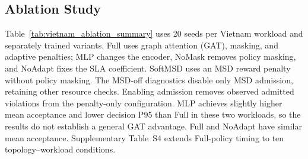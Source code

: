 \documentclass[final,5p]{elsarticle}
\newcommand{\rev}[1]{\textcolor{revisiongreen}{#1}}
\let\newrev\rev
\begin{document}
\begin{table}[t]
\color{revisiongreen}
\centering
\caption{\newrev{HARP--SAF-H acceptance differences ($\Delta$, percentage points; 20 paired seeds). Intervals: pointwise bootstrap 95\% CI (no multiplicity adjustment); $p_H$: Wilcoxon $p$ with Holm correction across nine conditions; $r$: rank-biserial effect. Profiles E/B/C follow Table~\ref{tab:simulation_acceptance_summary}.}}
\label{tab:benchmark_paired_statistics}
\scriptsize
\setlength{\tabcolsep}{3pt}
\end{table}

\subsection{Ablation Study}
\label{subsec:ablation_study}
\newrev{Table~\ref{tab:vietnam_ablation_summary} uses 20 seeds per Vietnam workload and separately trained variants. Full uses graph attention (GAT), masking, and adaptive penalties; MLP changes the encoder, NoMask removes policy masking, and NoAdapt fixes the SLA coefficient. SoftMSD uses an MSD reward penalty without policy masking. The MSD-off diagnostics disable only MSD admission, retaining other resource checks. Enabling admission removes observed admitted violations from the penalty-only configuration. MLP achieves slightly higher mean acceptance and lower decision P95 than Full in these two workloads, so the results do not establish a general GAT advantage. Full and NoAdapt have similar mean acceptance. Supplementary Table~S4 extends Full-policy timing to ten topology--workload conditions.}
\end{document}
